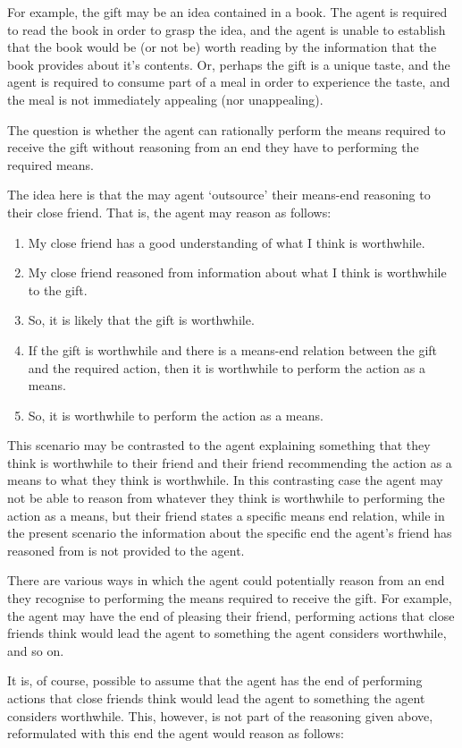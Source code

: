 \documentclass[10pt]{article}
\begin{document}
For example, the gift may be an idea contained in a book.
The agent is required to read the book in order to grasp the idea, and the agent is unable to establish that the book would be (or not be) worth reading by the information that the book provides about it's contents.
Or, perhaps the gift is a unique taste, and the agent is required to consume part of a meal in order to experience the taste, and the meal is not immediately appealing (nor unappealing).

The question is whether the agent can rationally perform the means required to receive the gift without reasoning from an end they have to performing the required means.

The idea here is that the may agent `outsource' their means-end reasoning to their close friend.
That is, the agent may reason as follows:
\begin{enumerate}
\item My close friend has a good understanding of what I think is worthwhile.
\item My close friend reasoned from information about what I think is worthwhile to the gift.
\item So, it is likely that the gift is worthwhile.
\item If the gift is worthwhile and there is a means-end relation between the gift and the required action, then it is worthwhile to perform the action as a means.
\item So, it is worthwhile to perform the action as a means.
\end{enumerate}

This scenario may be contrasted to the agent explaining something that they think is worthwhile to their friend and their friend recommending the action as a means to what they think is worthwhile.
In this contrasting case the agent may not be able to reason from whatever they think is worthwhile to performing the action as a means, but their friend states a specific means end relation, while in the present scenario the information about the specific end the agent's friend has reasoned from is not provided to the agent.

There are various ways in which the agent could potentially reason from an end they recognise to performing the means required to receive the gift.
For example, the agent may have the end of pleasing their friend, performing actions that close friends think would lead the agent to something the agent considers worthwhile, and so on.

It is, of course, possible to assume that the agent has the end of performing actions that close friends think would lead the agent to something the agent considers worthwhile.
This, however, is not part of the reasoning given above, reformulated with this end the agent would reason as follows:
\end{document}
